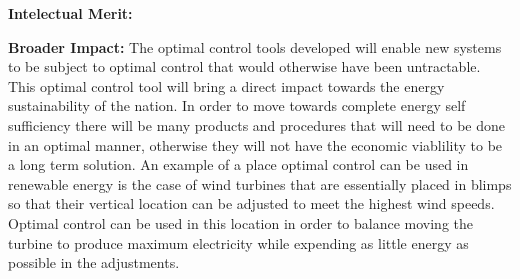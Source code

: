 \documentclass[12pt]{article}
\begin{document}

\bigskip


\textbf{Intelectual Merit:} 

% 
%

\bigskip


\textbf{Broader Impact:} The optimal control tools developed will enable new
systems to be subject to optimal control that would otherwise have been
untractable. This optimal control tool will bring a direct impact towards the
energy sustainability of the nation. In order to move towards complete energy
self sufficiency there will be many products and procedures that will need to
be done in an optimal manner, otherwise they will not have the economic
viablility to be a long term solution. An example of a place optimal control
can be used in renewable energy is the case of wind turbines that are
essentially placed in blimps so that their vertical location can be adjusted to
meet the highest wind speeds. Optimal control can be used in this location in
order to balance moving the turbine to produce maximum electricity while
expending as little energy as possible in the adjustments.
\end{document}

